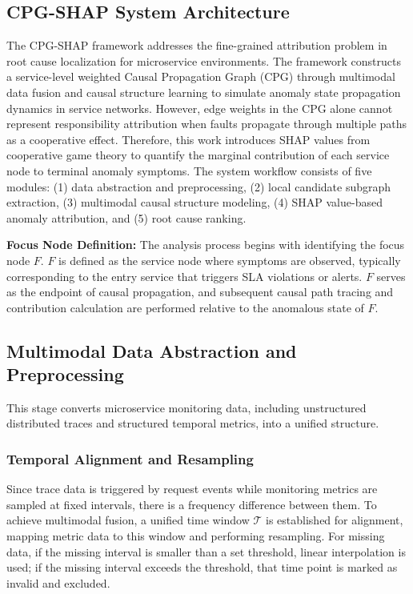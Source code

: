 \documentclass[conference]{IEEEtran}
\begin{document}
\subsection{CPG-SHAP System Architecture}

The CPG-SHAP framework addresses the fine-grained attribution problem in root cause localization for microservice environments. The framework constructs a service-level weighted Causal Propagation Graph (CPG) through multimodal data fusion and causal structure learning to simulate anomaly state propagation dynamics in service networks. However, edge weights in the CPG alone cannot represent responsibility attribution when faults propagate through multiple paths as a cooperative effect. Therefore, this work introduces SHAP values from cooperative game theory to quantify the marginal contribution of each service node to terminal anomaly symptoms. The system workflow consists of five modules: (1) data abstraction and preprocessing, (2) local candidate subgraph extraction, (3) multimodal causal structure modeling, (4) SHAP value-based anomaly attribution, and (5) root cause ranking.

\textbf{Focus Node Definition:} The analysis process begins with identifying the focus node $F$. $F$ is defined as the service node where symptoms are observed, typically corresponding to the entry service that triggers SLA violations or alerts. $F$ serves as the endpoint of causal propagation, and subsequent causal path tracing and contribution calculation are performed relative to the anomalous state of $F$.

\subsection{Multimodal Data Abstraction and Preprocessing}

This stage converts microservice monitoring data, including unstructured distributed traces and structured temporal metrics, into a unified structure.

\subsubsection{Temporal Alignment and Resampling}

Since trace data is triggered by request events while monitoring metrics are sampled at fixed intervals, there is a frequency difference between them. To achieve multimodal fusion, a unified time window $\mathcal{T}$ is established for alignment, mapping metric data to this window and performing resampling. For missing data, if the missing interval is smaller than a set threshold, linear interpolation is used; if the missing interval exceeds the threshold, that time point is marked as invalid and excluded.
\end{document}
